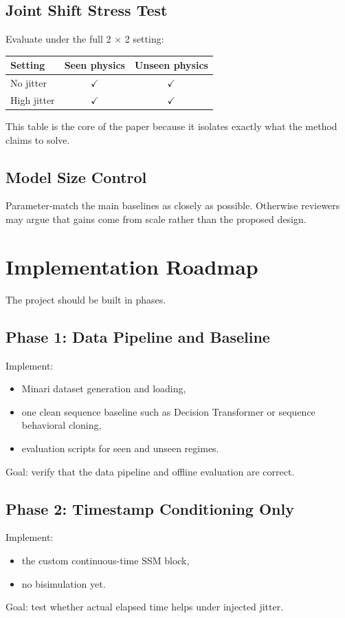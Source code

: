 \documentclass[11pt]{article}
\begin{document}
\subsection{Joint Shift Stress Test}
Evaluate under the full 2 $\times$ 2 setting:
\begin{center}
\begin{tabular}{lcc}
\toprule
Setting & Seen physics & Unseen physics \\
\midrule
No jitter & $\checkmark$ & $\checkmark$ \\
High jitter & $\checkmark$ & $\checkmark$ \\
\bottomrule
\end{tabular}
\end{center}

This table is the core of the paper because it isolates exactly what the method claims to solve.

\subsection{Model Size Control}
Parameter-match the main baselines as closely as possible. Otherwise reviewers may argue that gains come from scale rather than the proposed design.

\section{Implementation Roadmap}

The project should be built in phases.

\subsection{Phase 1: Data Pipeline and Baseline}
Implement:
\begin{itemize}[leftmargin=1.5em]
    \item Minari dataset generation and loading,
    \item one clean sequence baseline such as Decision Transformer or sequence behavioral cloning,
    \item evaluation scripts for seen and unseen regimes.
\end{itemize}
Goal: verify that the data pipeline and offline evaluation are correct.

\subsection{Phase 2: Timestamp Conditioning Only}
Implement:
\begin{itemize}[leftmargin=1.5em]
    \item the custom continuous-time SSM block,
    \item no bisimulation yet.
\end{itemize}
Goal: test whether actual elapsed time helps under injected jitter.
\end{document}
